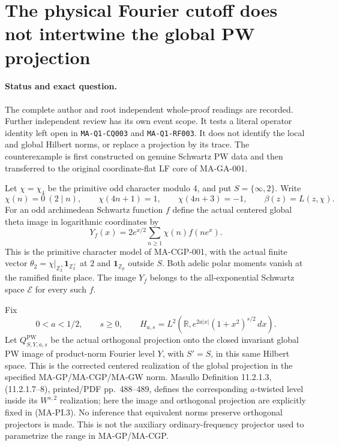 \section{The physical Fourier cutoff does not intertwine the global PW projection}
\label{sec:physical-projection-obstruction}

\paragraph{Status and exact question.}
The complete author and root independent whole-proof readings
are recorded. Further independent review has its own event scope.
It tests a literal operator identity left open in
\texttt{MA-Q1-CQ003} and \texttt{MA-Q1-RF003}.  It does not
identify the local and global Hilbert norms, or replace a
projection by its trace.  The counterexample is first constructed
on genuine Schwartz PW data and then transferred to the original
coordinate-flat LF core of MA-GA-001.

Let $\chi=\chi_4$ be the primitive odd character modulo $4$,
and put $S=\{\infty,2\}$.  Write
\[
 \chi(n)=0\ (2\mid n),\qquad
 \chi(4n+1)=1,\qquad\chi(4n+3)=-1,
 \qquad \beta(z)=L(z,\chi).
 \tag{MA-PI.1}
\]
For an odd archimedean Schwartz function $f$ define the actual
centered global theta image in logarithmic coordinates by
\[
 Y_f(x)=2e^{x/2}\sum_{n\geq1}\chi(n)f(ne^x).
 \tag{MA-PI.2}
\]
This is the primitive character model of MA-CGP-001, with
the actual finite vector
$\theta_2=\chi|_{\mathbb Z_2^\times}\mathbf1_{\mathbb Z_2^\times}$
at $2$ and $\mathbf1_{\mathbb Z_p}$ outside $S$.
Both adelic polar moments vanish at the ramified finite place.
The image $Y_f$ belongs to the all-exponential Schwartz space
$\mathcal E$ for every such $f$.

Fix
\[
 0<a<1/2,\qquad s\geq0,\qquad
 H_{a,s}=L^2\!\left(\mathbb R,
           e^{2a|x|}(1+x^2)^{s/2}\,dx\right).
 \tag{MA-PI.3}
\]
Let $Q^{\mathrm{PW}}_{S,Y,a,s}$ be the actual orthogonal
projection onto the closed invariant global PW image of
product-norm Fourier level $Y$, with $S'=S$, in this same
Hilbert space.  This is the corrected centered realization
of the global projection in the specified MA-GP/MA-CGP/MA-GW
norm.  Masullo Definition 11.2.1.3, (11.2.1.7--8),
printed/PDF pp.~488--489, defines the corresponding
$a$-twisted level inside its $W^{s,2}$ realization; here
the image and orthogonal projection are explicitly fixed
in (MA-PI.3).  No inference that equivalent norms preserve
orthogonal projectors is made.  This is not the auxiliary
ordinary-frequency projector used to parametrize the range
in MA-GP/MA-CGP.

